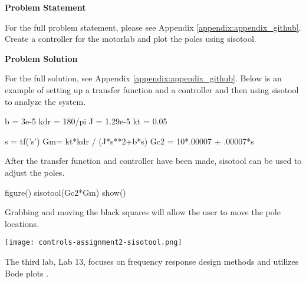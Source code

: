 \begin{tcolorbox}[breakable, enhanced jigsaw, title=ME 570: Assignment \ref{control_assignment_2}, 
    colframe=ksu-purple, colback=ksu-gray]

    \textbf{Problem Statement}
    \parindent15pt

    For the full problem statement, please see Appendix \ref{appendix:appendix_github}. Create a
    controller for the motorlab and plot the poles using sisotool.
    
    \tcblower
    \textbf{Problem Solution}
    \parindent15pt

    For the full solution, see Appendix \ref{appendix:appendix_github}. Below is an example of 
    setting up a transfer function and a controller and then using sisotool to analyze the system.

\begin{python}
b = 3e-5
kdr = 180/pi
J = 1.29e-5
kt = 0.05

s = tf('s')
Gm= kt*kdr / (J*s**2+b*s)
Gc2 = 10*.00007 + .00007*s
\end{python}

After the transfer function and controller have been made, sisotool can be used to adjust the poles.

\begin{python}
figure()
sisotool(Gc2*Gm)
show()
\end{python}

Grabbing and moving the black squares will allow the user to move the pole locations.

\begin{center}
    \texttt{[image: controls-assignment2-sisotool.png]}
\end{center}
\end{tcolorbox}

The third lab, Lab 13, focuses on frequency response design methods and utilizes Bode plots \cite{controls-13}.

\label{control_assignment_3}

